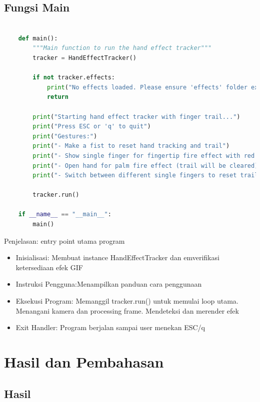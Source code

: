 \documentclass[11pt,a4paper]{article}
\begin{document}
    \subsection{Fungsi Main}
    \begin{lstlisting}[language=Python, caption=Fungsi Main]
    
    def main():
        """Main function to run the hand effect tracker"""
        tracker = HandEffectTracker()
        
        if not tracker.effects:
            print("No effects loaded. Please ensure 'effects' folder exists with GIF files.")
            return
        
        print("Starting hand effect tracker with finger trail...")
        print("Press ESC or 'q' to quit")
        print("Gestures:")
        print("- Make a fist to reset hand tracking and trail")
        print("- Show single finger for fingertip fire effect with red trail")
        print("- Open hand for palm fire effect (trail will be cleared)")
        print("- Switch between different single fingers to reset trail")
        
        tracker.run()
    
    if __name__ == "__main__":
        main()
    \end{lstlisting}
    Penjelasan: entry point utama program 
    \begin{itemize}
        \item Inisialisasi: Membuat instance HandEffectTracker dan emverifikasi ketersediaan efek GIF
        \item Instruksi Pengguna:Menampilkan panduan cara penggunaan
        \item Eksekusi Program: Memanggil tracker.run() untuk memulai loop utama. Menangani kamera dan processing frame. Mendeteksi dan merender efek
        \item Exit Handler: Program berjalan sampai user menekan ESC/q
    \end{itemize}
    
\newpage
\section{Hasil dan Pembahasan}
    \subsection{Hasil}
\end{document}
